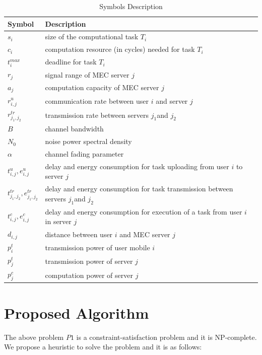 \documentclass[conference]{IEEEtran}
\begin{document}
\begin{table}[htbp]
\caption{Symbols Description}
\begin{center}
\begin{tabular}{|p{0.6in}|p{2.5in}|}
\hline
\textbf{Symbol}&\textbf{Description}\\
\hline
$s_i$ & size of the computational task $T_i$  \\
\hline
$c_i$ & computation resource (in cycles) needed for task $T_i$ \\
\hline
$t_i^{max}$ & deadline for task $T_i$ \\
\hline
$r_j$ & signal range of MEC server $j$ \\
\hline
$a_j$ & computation capacity of MEC server $j$ \\
\hline
$r^u_{i,j}$ & communication rate between user $i$ and server $j$ \\
\hline
$r^{tr}_{j_1,j_2}$ & transmission rate between servers $j_1$and $j_2$ \\
\hline
$B$ & channel bandwidth \\
\hline
$N_0$ & noise power spectral density \\
\hline
$\alpha$ & channel fading parameter \\
\hline
$t^u_{i,j}, e^u_{i,j}$ & delay and energy consumption for task uploading from user $i$ to server $j$ \\
\hline
$t^{tr}_{j_1,j_2}, e^{tr}_{j_1,j_2}$ & delay and energy consumption for task transmission between servers $j_1$and $j_2$ \\
\hline
$t^c_{i,j}, e^c_{i,j}$ & delay and energy consumption for execution of a task from user $i$ in server $j$  \\
\hline
$d_{i,j}$ & distance between user $i$ and MEC server $j$ \\
\hline
$p_i^t$ & transmission power of user mobile $i$ \\
\hline
$p_j^t$ & transmission power of server $j$ \\
\hline
$p_j^c$ & computation power of server $j$ \\
\hline
\end{tabular}
\label{table.1}
\end{center}
\end{table}


\section{ Proposed Algorithm}

 The above problem $P1$ is a constraint-satisfaction problem and it is NP-complete. We propose a heuristic to solve the problem and it is as follows: 
\end{document}
